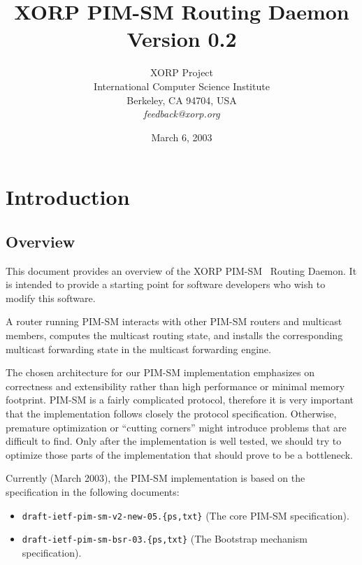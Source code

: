 \documentclass[11pt]{article}
\begin{document}
\title{XORP PIM-SM Routing Daemon \\
\vspace{1ex}
Version 0.2}
\author{ XORP Project					\\
	 International Computer Science Institute	\\
	 Berkeley, CA 94704, USA			\\
	 {\it feedback@xorp.org}
}
\date{March 6, 2003}

\maketitle

\thispagestyle{empty}


\section{Introduction}


\subsection{Overview}

This document provides an overview of the XORP PIM-SM~\cite{PIM-SM}
Routing Daemon. It is intended to provide a starting point for software
developers who wish to modify this software.

A router running PIM-SM interacts with other PIM-SM routers and
multicast members, computes the multicast routing state, and installs
the corresponding multicast forwarding state in the multicast forwarding
engine.

The chosen architecture for our PIM-SM implementation emphasizes on
correctness and extensibility rather than high performance or minimal
memory footprint. PIM-SM is a fairly complicated protocol, therefore it
is very important that the implementation follows closely the protocol
specification. Otherwise, premature optimization or ``cutting corners''
might introduce problems that are difficult to find. Only after the
implementation is well tested, we should
try to optimize those parts of the implementation that should prove
to be a bottleneck.

Currently (March 2003), the PIM-SM implementation is based
on the specification in the following documents:
\begin{itemize}
  \item \verb=draft-ietf-pim-sm-v2-new-05.{ps,txt}= (The core PIM-SM
  specification).
  \item \verb=draft-ietf-pim-sm-bsr-03.{ps,txt}= (The Bootstrap mechanism
  specification).
\end{itemize}
\end{document}
